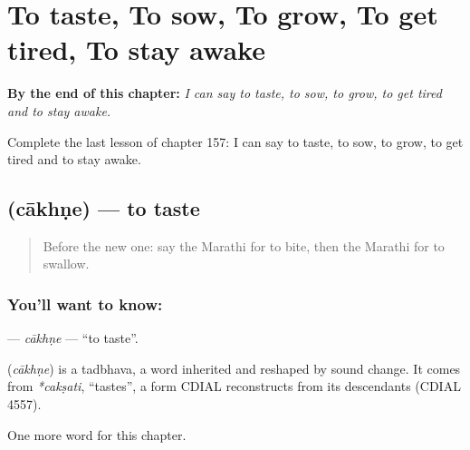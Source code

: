 
\chapter{To taste, To sow, To grow, To get tired, To stay awake}
\label{ch:mr-to-taste-to-sow-to-grow-to-get-tired-to-stay-awake}

\begin{chapteropening}
\textbf{By the end of this chapter:} \emph{I can say to taste, to sow, to grow, to get tired and to stay awake.}

Complete the last lesson of chapter 157: I can say to taste, to sow, to grow, to get tired and to stay awake.
\end{chapteropening}

\section[\texorpdfstring{\mr{चाखणे} (cākhṇe)}{चाखणे (cākhṇe)}]{ (cākhṇe) — to taste}

\label{lesson:MR-C157-cakhne}



\begin{quote}
Before the new one: say the Marathi for to bite, then the Marathi for to swallow.
\end{quote}

\subsection*{You'll want to know: }
\textbf{} — \emph{cākhṇe} — \textquotedblleft{}to taste\textquotedblright{}.

\begin{cousinweb}
\textbf{} (\emph{cākhṇe}) is a tadbhava, a word inherited and reshaped by sound change. It comes from \emph{*cakṣati}, \textquotedblleft{}tastes\textquotedblright{}, a form CDIAL reconstructs from its descendants (CDIAL 4557).
\end{cousinweb}

\begin{grammarlens}[title={What you've built}]
One more word for this chapter.
\end{grammarlens}

